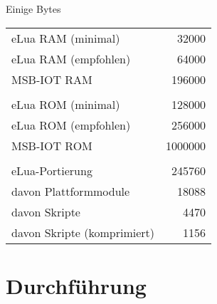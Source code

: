 \documentclass[xcolor=svgnames]{beamer}
\begin{document}
\begin{frame}{Einige Bytes}



\begin{tabular}{lr}
eLua RAM (minimal)          &   \num{32000}     \\
eLua RAM (empfohlen)        &   \num{64000}     \\
MSB-IOT RAM                 &   \num{196000}    \\
\\
eLua ROM (minimal)          &   \num{128000}    \\
eLua ROM (empfohlen)        &   \num{256000}    \\
MSB-IOT ROM                 &   \num{1000000}   \\
\\
eLua-Portierung             &   \num{245760}    \\
davon Plattformmodule       &   \num{18088}     \\
davon Skripte               &   \num{4470}      \\
davon Skripte (komprimiert) &   \num{1156}      \\
\end{tabular}
\end{frame}
 
\section{Durchführung}
\end{document}
